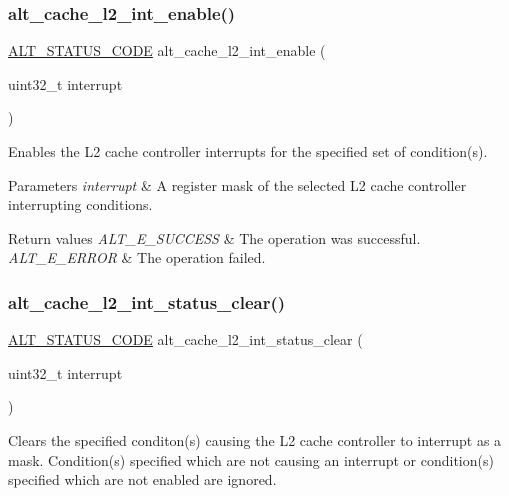 \subsubsection{\texorpdfstring{alt\_cache\_l2\_int\_enable()}{alt\_cache\_l2\_int\_enable()}}
{\footnotesize\ttfamily \mbox{\hyperlink{hwlib_8h_abdb0d369f069723ca55d6c94bcaaaa12}{A\+L\+T\+\_\+\+S\+T\+A\+T\+U\+S\+\_\+\+C\+O\+DE}} alt\+\_\+cache\+\_\+l2\+\_\+int\+\_\+enable (\begin{DoxyParamCaption}\item[{uint32\+\_\+t}]{interrupt }\end{DoxyParamCaption})}

Enables the L2 cache controller interrupts for the specified set of condition(s).


\begin{DoxyParams}{Parameters}
{\em interrupt} & A register mask of the selected L2 cache controller interrupting conditions.\\
\hline
\end{DoxyParams}

\begin{DoxyRetVals}{Return values}
{\em A\+L\+T\+\_\+\+E\+\_\+\+S\+U\+C\+C\+E\+SS} & The operation was successful. \\
\hline
{\em A\+L\+T\+\_\+\+E\+\_\+\+E\+R\+R\+OR} & The operation failed. \\
\hline
\end{DoxyRetVals}
\mbox{\label{group__CACHE__L2_gac5f93b2bfd3a80f19e24e196164d13d4}} 
\subsubsection{\texorpdfstring{alt\_cache\_l2\_int\_status\_clear()}{alt\_cache\_l2\_int\_status\_clear()}}
{\footnotesize\ttfamily \mbox{\hyperlink{hwlib_8h_abdb0d369f069723ca55d6c94bcaaaa12}{A\+L\+T\+\_\+\+S\+T\+A\+T\+U\+S\+\_\+\+C\+O\+DE}} alt\+\_\+cache\+\_\+l2\+\_\+int\+\_\+status\+\_\+clear (\begin{DoxyParamCaption}\item[{uint32\+\_\+t}]{interrupt }\end{DoxyParamCaption})}

Clears the specified conditon(s) causing the L2 cache controller to interrupt as a mask. Condition(s) specified which are not causing an interrupt or condition(s) specified which are not enabled are ignored.


